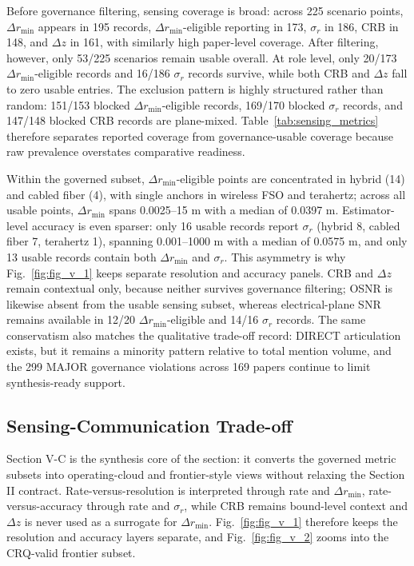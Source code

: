 \documentclass[letterpaper,journal]{IEEEtran}
\begin{document}
Before governance filtering, sensing coverage is broad: across 225 scenario points, $\Delta r_{\min}$ appears in 195 records, $\Delta r_{\min}$-eligible reporting in 173, $\sigma_r$ in 186, CRB in 148, and $\Delta z$ in 161, with similarly high paper-level coverage. After filtering, however, only 53/225 scenarios remain usable overall. At role level, only 20/173 $\Delta r_{\min}$-eligible records and 16/186 $\sigma_r$ records survive, while both CRB and $\Delta z$ fall to zero usable entries. The exclusion pattern is highly structured rather than random: 151/153 blocked $\Delta r_{\min}$-eligible records, 169/170 blocked $\sigma_r$ records, and 147/148 blocked CRB records are plane-mixed. Table~\ref{tab:sensing_metrics} therefore separates reported coverage from governance-usable coverage because raw prevalence overstates comparative readiness.

Within the governed subset, $\Delta r_{\min}$-eligible points are concentrated in hybrid (14) and cabled fiber (4), with single anchors in wireless FSO and terahertz; across all usable points, $\Delta r_{\min}$ spans 0.0025--15 m with a median of 0.0397 m. Estimator-level accuracy is even sparser: only 16 usable records report $\sigma_r$ (hybrid 8, cabled fiber 7, terahertz 1), spanning 0.001--1000 m with a median of 0.0575 m, and only 13 usable records contain both $\Delta r_{\min}$ and $\sigma_r$. This asymmetry is why Fig.~\ref{fig:fig_v_1} keeps separate resolution and accuracy panels. CRB and $\Delta z$ remain contextual only, because neither survives governance filtering; OSNR is likewise absent from the usable sensing subset, whereas electrical-plane SNR remains available in 12/20 $\Delta r_{\min}$-eligible and 14/16 $\sigma_r$ records. The same conservatism also matches the qualitative trade-off record: DIRECT articulation exists, but it remains a minority pattern relative to total mention volume, and the 299 MAJOR governance violations across 169 papers continue to limit synthesis-ready support.


\subsection{Sensing-Communication Trade-off}
Section V-C is the synthesis core of the section: it converts the governed metric subsets into operating-cloud and frontier-style views without relaxing the Section II contract. Rate-versus-resolution is interpreted through rate and $\Delta r_{\min}$, rate-versus-accuracy through rate and $\sigma_r$, while CRB remains bound-level context and $\Delta z$ is never used as a surrogate for $\Delta r_{\min}$. Fig.~\ref{fig:fig_v_1} therefore keeps the resolution and accuracy layers separate, and Fig.~\ref{fig:fig_v_2} zooms into the CRQ-valid frontier subset.
\end{document}
